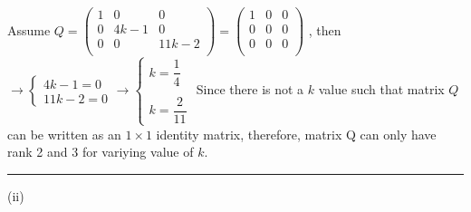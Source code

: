 \documentclass[fleqn]{article}
\begin{document}
\begin{enumerate}
      \textcolor{hwColor}{
        Assume
        $
          Q=\begin{pmatrix}
          1 & 0 & 0 \\
          0 & 4k-1 & 0 \\
          0 & 0 & 11k-2 \\
        \end{pmatrix}=\begin{pmatrix}
          1 & 0 & 0 \\
          0 & 0 & 0 \\
          0 & 0 & 0 \\
        \end{pmatrix}
        $
        , then 
        $
         \longrightarrow
         \begin{cases}
           4k-1=0 \\
           11k-2=0  
         \end{cases}
         \longrightarrow
         \begin{cases}
           k=\dfrac{1}{4} \\
           \\
           k= \dfrac{2}{11} 
         \end{cases}
        $
        Since there is not a $k$ value such that matrix $Q$ can be written as an $1 \times 1$ identity matrix, therefore, matrix Q can only have rank 2 and 3 for variying value of $k$. 
      }

      \bigbreak

      \textcolor{hwColor}{
        \rule{16cm}{0.4pt}
      }

      \bigbreak

      \textcolor{hwColor}{
        (ii) 
      }


  \end{enumerate}
\end{document}
